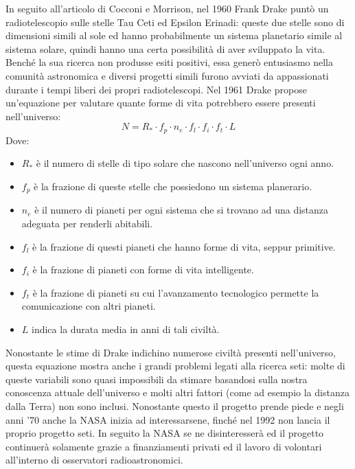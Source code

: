 In seguito all'articolo di Cocconi e Morrison, nel 1960 Frank Drake punt\`o un
radiotelescopio sulle stelle Tau Ceti ed Epsilon Erinadi: queste due stelle sono
di dimensioni simili al sole ed hanno probabilmente un sistema planetario simile
al sistema solare, quindi hanno una certa possibilit\`a di aver sviluppato la
vita. Bench\'e la sua ricerca non produsse esiti positivi, essa gener\`o
entusiasmo nella comunit\`a astronomica e diversi progetti simili furono avviati
da appassionati durante i tempi liberi dei propri radiotelescopi.
Nel 1961 Drake propose un'equazione per valutare quante forme di vita potrebbero
essere presenti nell'universo:
\[
N = R_* \cdot f_p \cdot n_e \cdot f_l \cdot f_i \cdot f_t \cdot L
\]
Dove:
\begin{itemize}
    \item $R_*$ \`e il numero di stelle di tipo solare che nascono nell'universo
    ogni anno.
    \item $f_p$ \`e la frazione di queste stelle che possiedono un sistema
    planerario.
    \item $n_e$ \`e il numero di pianeti per ogni sistema che si trovano ad una
    distanza adeguata per renderli abitabili.
    \item $f_l$ \`e la frazione di questi pianeti che hanno forme di vita,
    seppur primitive.
    \item $f_i$ \`e la frazione di pianeti con forme di vita intelligente.
    \item $f_t$ \`e la frazione di pianeti su cui l'avanzamento tecnologico
    permette la comunicazione con altri pianeti.
    \item $L$ indica la durata media in anni di tali civilt\`a.
\end{itemize}

Nonostante le stime di Drake indichino numerose civilt\`a presenti
nell'universo, questa equazione mostra anche i grandi problemi legati alla
ricerca \ac{seti}: molte di queste variabili sono quasi impossibili da stimare
basandosi sulla nostra conoscenza attuale dell'universo e molti altri fattori
(come ad esempio la distanza dalla Terra) non sono inclusi. Nonostante questo il
progetto prende piede e negli anni '70 anche la NASA inizia ad interessarsene,
finch\'e nel 1992 non lancia il proprio progetto \ac{seti}. In seguito la NASA
se ne disinteresser\`a ed il progetto continuer\`a solamente grazie a
finanziamenti privati ed il lavoro di volontari all'interno di osservatori
radioastronomici.

